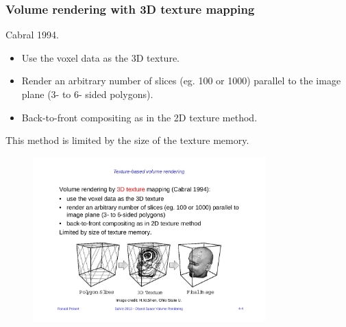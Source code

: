 \subsubsection{Volume rendering with 3D texture mapping}
Cabral 1994.
\begin{itemize}
    \item Use the voxel data as the 3D texture.
    \item Render an arbitrary number of slices (eg. 100 or 1000) parallel to the image plane (3- to 6- sided polygons).
    \item Back-to-front compositing as in the 2D texture method.
\end{itemize}
This method is limited by the size of the texture memory. 
\begin{figure}[H]
    \centering
    \includegraphics[width=0.8\textwidth]{img/04_3dtexture_based_volume_rendering}
\end{figure}

